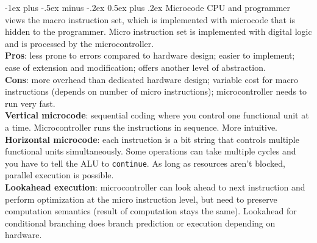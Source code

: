 \documentclass[10pt,landscape]{article}
\makeatletter
\renewcommand{\section}{\@startsection{section}{1}{0mm}%
                                {-1ex plus -.5ex minus -.2ex}%
                                {0.5ex plus .2ex}%
                                {\normalfont\small\bfseries}}
\makeatother
\begin{document}
\begin{multicols}{3}
\section{Microcode}
CPU and programmer views the macro instruction set, which is implemented with microcode that is hidden to the programmer. Micro instruction set is implemented with digital logic and is processed by the microcontroller.\\
\textbf{Pros}: less prone to errors compared to hardware design; easier to implement; ease of extension and modification; offers another level of abstraction.\\
\textbf{Cons}: more overhead than dedicated hardware design; variable cost for macro instructions (depends on number of micro instructions); microcontroller needs to run very fast.\\
\textbf{Vertical microcode}: sequential coding where you control one functional unit at a time. Microcontroller runs the instructions in sequence. More intuitive.\\
\textbf{Horizontal microcode}: each instruction is a bit string that controls multiple functional units simultaneously. Some operations can take multiple cycles and you have to tell the ALU to \texttt{continue}. As long as resources aren't blocked, parallel execution is possible.\\
\textbf{Lookahead execution}: microcontroller can look ahead to next instruction and perform optimization at the micro instruction level, but need to preserve computation semantics (result of computation stays the same). Lookahead for conditional branching does branch prediction or execution depending on hardware.

\end{multicols}
\end{document}
